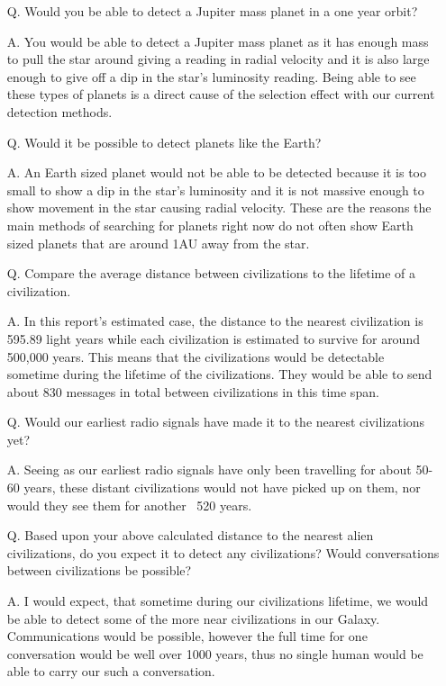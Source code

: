 \documentclass{article}
\begin{document}
\begin{enumerate}
\item[Q.] Would you be able to detect a Jupiter mass planet in a one year orbit?
\item[A.] You would be able to detect a Jupiter mass planet as it has enough mass to pull the star around giving a reading in 
radial velocity and it is also large enough to give off a dip in the star's luminosity reading. Being able to see these types of
planets is a direct cause of the selection effect with our current detection methods.
\item[Q.] Would it be possible to detect planets like the Earth?
\item[A.] An Earth sized planet would not be able to be detected because it is too small to show a dip in the star's luminosity
and it is not massive enough to show movement in the star causing radial velocity. These are the reasons the main methods
of searching for planets right now do not often show Earth sized planets that are around 1AU away from the star.
\item[Q.] Compare the average distance between civilizations to the lifetime of a civilization.
\item[A.] In this report's estimated case, the distance to the nearest civilization is 595.89 light years while each civilization is
estimated to survive for around 500,000 years. This means that the civilizations would be detectable sometime during
the lifetime of the civilizations. They would be able to send about 830 messages in total between civilizations in this
time span.
\item[Q.] Would our earliest radio signals have made it to the nearest civilizations yet?
\item[A.] Seeing as our earliest radio signals have only been travelling for about 50-60 years, these distant civilizations would
not have picked up on them, nor would they see them for another ~520 years.
\item[Q.] Based upon your above calculated distance to the nearest alien civilizations, do you expect it to detect any civilizations?
Would conversations between civilizations be possible?
\item[A.] I would expect, that sometime during our civilizations lifetime, we would be able to detect some of the more near
civilizations in our Galaxy. Communications would be possible, however the full time for one conversation would be well over 
1000 years, thus no single human would be able to carry our such a conversation.

\end{enumerate}
\end{document}
